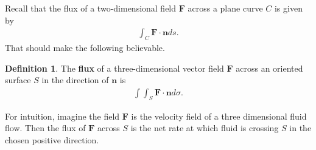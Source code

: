 \documentclass[12pt, letter]{article}
\theoremstyle{plain}
\numberwithin{theorem}{section}
\theoremstyle{definition}
\newtheorem{definition}[theorem]{Definition}
\begin{document}
Recall that the flux of a two-dimensional field $\bm{F}$ across a plane curve $C$ is given by
\begin{align*}
\int_C \bm{F}\cdot\bm{n}ds.
\end{align*}
That should make the following believable.

\bigskip

\begin{definition}
The \textbf{flux} of a three-dimensional vector field $\bm{F}$ across an oriented surface $S$ in the direction of $\bm{n}$ is
\begin{align*}
\int\int_S \bm{F}\cdot\bm{n}d\sigma.
\end{align*}
\end{definition}

\bigskip

For intuition, imagine the field $\bm{F}$ is the velocity field of a three dimensional fluid flow. Then the flux of $\bm{F}$ across $S$ is the net rate at which fluid is crossing $S$ in the chosen positive direction.

\bigskip

\hrulefill

\bigskip
\end{document}
